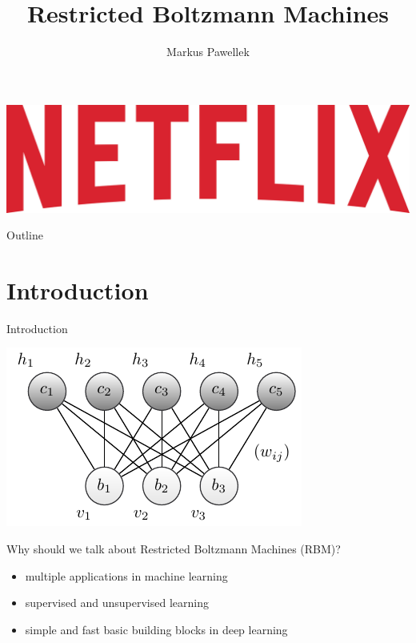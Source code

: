 \documentclass[aspectratio=169]{beamer}
\title{Restricted Boltzmann Machines}
\author{Markus Pawellek}
\begin{document}
  \renewcommand{\separate}{\qquad}

  \begin{frame}
    \vfill
    \includegraphics[width=\textwidth]{images/netflix-logo.jpg}
    \vfill
  \end{frame}

  \frame{\titlepage}
  \begin{frame}{Outline}
    \footnotesize
    \hfill\parbox[t][7cm][l]{0.9\textwidth}{\tableofcontents}
  \end{frame}

  \section{Introduction} %
  \label{sec:introduction}
    \begin{frame}{Introduction}
      \begin{center}
        \includegraphics[height=0.35\textheight]{figures/rbm-scheme.pdf}
      \end{center}

      Why should we talk about Restricted Boltzmann Machines (RBM)?
      \begin{itemize}
        \pause
        \item multiple applications in machine learning
        \pause
        \item supervised and unsupervised learning
        \pause
        \item simple and fast basic building blocks in deep learning
      \end{itemize}
    \end{frame}
\end{document}
